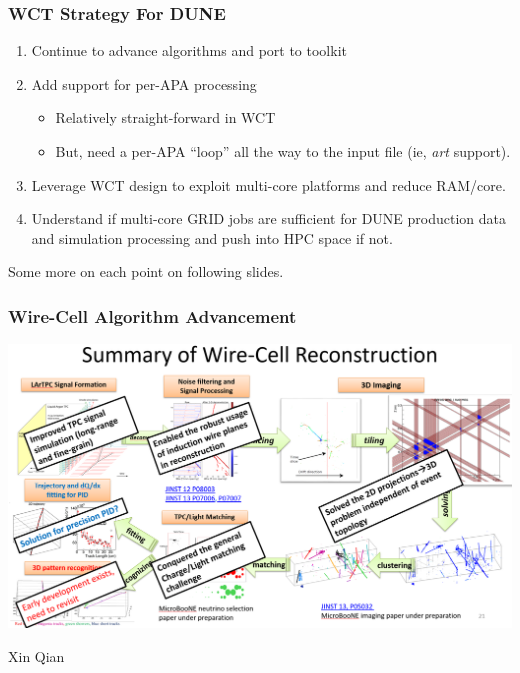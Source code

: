 \documentclass[xcolor=dvipsnames]{beamer}
\begin{document}
\begin{frame}
  \frametitle{WCT Strategy For DUNE}
  \begin{enumerate}
  \item Continue to advance algorithms and port to toolkit 
  \item Add support for per-APA processing
    \begin{itemize}\scriptsize
    \item Relatively straight-forward in WCT 
    \item But, need a per-APA ``loop'' all the way to the input file (ie, \textit{art} support).
    \end{itemize}
  \item Leverage WCT design to exploit multi-core platforms and reduce RAM/core.
  \item Understand if multi-core GRID jobs are sufficient for DUNE production data and simulation processing and push into HPC space if not.
  \end{enumerate}

  Some more on each point on following slides.
\end{frame}


\begin{frame}
  \frametitle{Wire-Cell Algorithm Advancement}

  \begin{center}
    \includegraphics[width=\textwidth,clip,trim=0 0 0 3cm]{summary-of-wc-reco-boxes.png}

    \tiny Xin Qian
  \end{center}

\end{frame}
\end{document}
